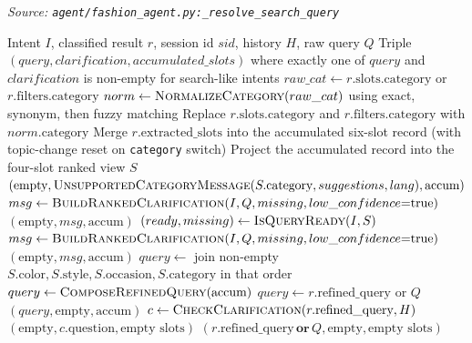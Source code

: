 \begin{algorithm}[H]
\caption{Resolve the Search Query (Pre-Search Gating)}\label{alg:resolve_search_query}
\textit{Source: \texttt{agent/fashion\_agent.py:\_resolve\_search\_query}}
\begin{algorithmic}[1]
\Require Intent $I$, classified result $r$, session id $sid$, history $H$, raw query $Q$
\Ensure Triple $(query, clarification, accumulated\_slots)$ where exactly one of $query$ and $clarification$ is non-empty for search-like intents
        \State $raw\_cat \gets r.\text{slots.category}$ or $r.\text{filters.category}$
        \State $norm \gets \textsc{NormalizeCategory}(raw\_cat)$ using exact, synonym, then fuzzy matching
            \State Replace $r.\text{slots.category}$ and $r.\text{filters.category}$ with $norm.\text{category}$
        \EndIf
        \State Merge $r.\text{extracted\_slots}$ into the accumulated six-slot record (with topic-change reset on \texttt{category} switch)
        \State Project the accumulated record into the four-slot ranked view $S$
            \State \Return $(\text{empty}, \textsc{UnsupportedCategoryMessage}(S.\text{category}, suggestions, lang), \text{accum})$
        \EndIf
        \State $msg \gets \textsc{BuildRankedClarification}(I, Q, missing, low\_confidence{=}\text{true})$
            \State \Return $(\text{empty}, msg, \text{accum})$
        \EndIf
        \State $(ready, missing) \gets \textsc{IsQueryReady}(I, S)$ 
            \State $msg \gets \textsc{BuildRankedClarification}(I, Q, missing, low\_confidence{=}\text{true})$
            \State \Return $(\text{empty}, msg, \text{accum})$
        \EndIf
        \State $query \gets$ join non-empty $S.\text{color}, S.\text{style}, S.\text{occasion}, S.\text{category}$ in that order
        \State $query \gets \textsc{ComposeRefinedQuery}(\text{accum})$\EndIf
        \State $query \gets r.\text{refined\_query}$ or $Q$\EndIf
        \State \Return $(query, \text{empty}, \text{accum})$
    \EndIf
        \State $c \gets \textsc{CheckClarification}(r.\text{refined\_query}, H)$
        \State \Return $(\text{empty}, c.\text{question}, \text{empty slots})$\EndIf
    \EndIf
    \State \Return $(r.\text{refined\_query}\,\textbf{or}\,Q, \text{empty}, \text{empty slots})$
\EndFunction
\end{algorithmic}
\end{algorithm}

